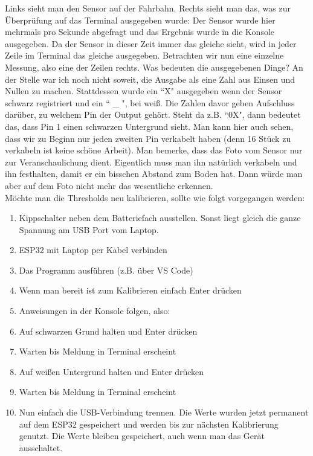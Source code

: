	
	Links sieht man den Sensor auf der Fahrbahn. Rechts sieht man das, was zur Überprüfung auf das Terminal ausgegeben wurde:
	Der Sensor wurde hier mehrmals pro Sekunde abgefragt und das Ergebnis wurde in die Konsole ausgegeben. Da der Sensor in dieser Zeit immer das gleiche sieht, wird in jeder Zeile im Terminal das gleiche ausgegeben. Betrachten wir nun eine einzelne Messung, also eine der Zeilen rechts. Was bedeuten die ausgegebenen Dinge? An der Stelle war ich noch nicht soweit, die Ausgabe als eine Zahl aus Einsen und Nullen zu machen. Stattdessen wurde ein ``X" ausgegeben wenn der Sensor schwarz registriert und ein `` \_ ", bei weiß. Die Zahlen davor geben Aufschluss darüber, zu welchem Pin der Output gehört. Steht da z.B. ``0X", dann bedeutet das, dass Pin 1 einen schwarzen Untergrund sieht. Man kann hier auch sehen, dass wir zu Beginn nur jeden zweiten Pin verkabelt haben (denn 16 Stück zu verkabeln ist keine schöne Arbeit). Man bemerke, dass das Foto vom Sensor nur zur Veranschaulichung dient. Eigentlich muss man ihn natürlich verkabeln und ihn festhalten, damit er ein bisschen Abstand zum Boden hat. Dann würde man aber auf dem Foto nicht mehr das wesentliche erkennen.
	\\

	Möchte man die Thresholds neu kalibrieren, sollte wie folgt vorgegangen werden: 
	
	
\begin{enumerate}
	\item  Kippschalter neben dem Batteriefach ausstellen. Sonst liegt gleich die ganze Spannung am USB Port vom Laptop.
	\item  ESP32 mit Laptop per Kabel verbinden
	\item  Das Programm ausführen (z.B.  über VS Code)
	\item  Wenn man bereit ist zum Kalibrieren einfach Enter drücken
	\item  Anweisungen in der Konsole folgen, also:
	\item Auf schwarzen Grund halten und Enter drücken
	\item Warten bis Meldung in Terminal erscheint
	\item Auf weißen Untergrund halten und Enter drücken
	\item Warten bis Meldung in Terminal erscheint
	\item Nun einfach die USB-Verbindung trennen. Die Werte wurden jetzt permanent auf dem ESP32 gespeichert und werden bis zur nächsten Kalibrierung genutzt. Die Werte bleiben gespeichert, auch wenn man das Gerät ausschaltet.
	
\end{enumerate}
	
